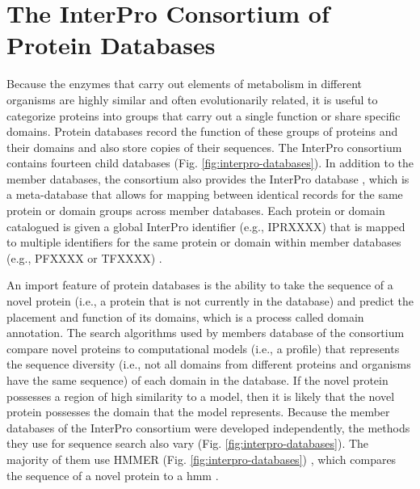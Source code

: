 \section{The InterPro Consortium of Protein Databases} \label{InterProDatabases}

Because the enzymes that carry out elements of metabolism in different organisms are highly similar and often evolutionarily related, it is useful to categorize proteins into groups that carry out a single function or share specific domains. Protein databases record the function of these groups of proteins and their domains and also store copies of their sequences. The InterPro consortium \cite{apweiler2000interpro,hunter2008interpro,Hunter2009} contains fourteen child databases \cite{finn2016interpro,Hunter2009} (Fig. \ref{fig:interpro-databases}). In addition to the member databases, the consortium also provides the InterPro database \cite{hunter2008interpro,finn2016interpro}, which is a meta-database that allows for mapping between identical records for the same protein or domain groups across member databases. Each protein or domain catalogued is given a global InterPro identifier (e.g., IPRXXXX) that is mapped to multiple identifiers for the same protein or domain within member databases (e.g., PFXXXX or TFXXXX) \cite{hunter2008interpro,finn2016interpro}.

An import feature of protein databases is the ability to take the sequence of a novel protein (i.e., a protein that is not currently in the database) and predict the placement and function of its domains, which is a process called domain annotation. The search algorithms used by members database of the consortium compare novel proteins to computational models (i.e., a profile) that represents the sequence diversity (i.e., not all domains from different proteins and organisms have the same sequence) of each domain in the database. If the novel protein possesses a region of high similarity to a model, then it is likely that the novel protein possesses the domain that the model represents. Because the member databases of the InterPro consortium were developed independently, the methods they use for sequence search also vary (Fig. \ref{fig:interpro-databases}). The majority of them use HMMER (Fig. \ref{fig:interpro-databases}) \cite{eddy2011accelerated}, which compares the sequence of a novel protein to a \gls{hmm} \cite{de2007hidden}.

